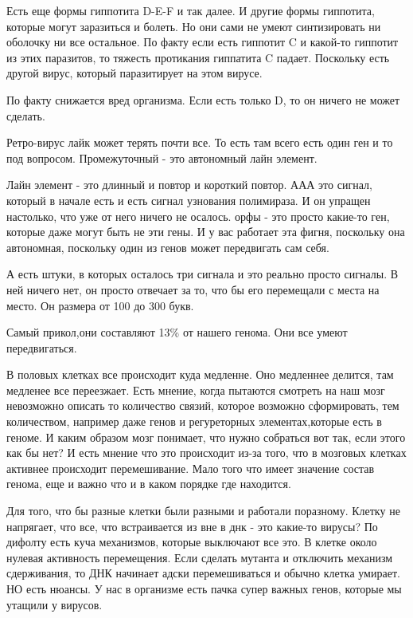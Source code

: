 Есть еще формы гиппотита D-E-F и так далее. И другие формы гиппотита, которые могут заразиться 
и болеть. Но они сами не умеют синтизировать ни оболочку ни все остальное. По факту если есть 
гиппотит C и какой-то гиппотит из этих паразитов, то тяжесть протикания гиппатита C падает. 
Поскольку есть другой вирус, который паразитирует на этом вирусе. 

По факту снижается вред организма. Если есть только D, то он ничего не может сделать. 

Ретро-вирус лайк может терять почти все. То есть там всего есть один ген и то 
под вопросом. Промежуточный - это автономный лайн элемент. 

Лайн элемент - это длинный и повтор
и короткий повтор. ААА это сигнал, который в начале
есть и есть сигнал узнования полимираза. И он упращен настолько,
что уже от него ничего не осалось. орфы - это просто какие-то
ген, которые даже могут быть не эти гены. И у вас работает эта фигня,
поскольку она автономная, поскольку один из генов может передвигать сам себя.

А есть штуки, в которых осталось три сигнала и это
реально просто сигналы. В ней ничего нет, он просто отвечает за то,
что бы его перемещали с места на место. Он размера от 100 до 300 букв.

Самый прикол,они составляют 13\% от нашего генома. Они все умеют передвигаться.

В половых клетках все происходит куда медленне. Оно медленнее делится, там медленее все переезжает.
Есть мнение, когда пытаются смотреть на наш мозг невозможно описать
то количество связий, которое возможно сформировать, тем количеством, например даже
генов и регуреторных элементах,которые есть в геноме. И каким образом мозг понимает,
что нужно собраться вот так, если этого как бы нет? И  есть мнение что это происходит
из-за того, что в мозговых клетках активнее происходит перемешивание.
Мало того что имеет значение состав генома, еще и важно что и в каком порядке где находится.

Для того, что бы разные клетки были разными и работали поразному. Клетку не напрягает, что 
все, что встраивается из вне в днк - это какие-то вирусы? По дифолту есть 
куча механизмов, которые выключают все это. В клетке около нулевая 
активность перемещения. Если сделать мутанта и отключить 
механизм сдерживания, то ДНК начинает адски перемешиваться 
и обычно клетка умирает. НО есть 
нюансы. У нас в организме есть 
пачка супер важных генов, которые мы утащили у вирусов. 

